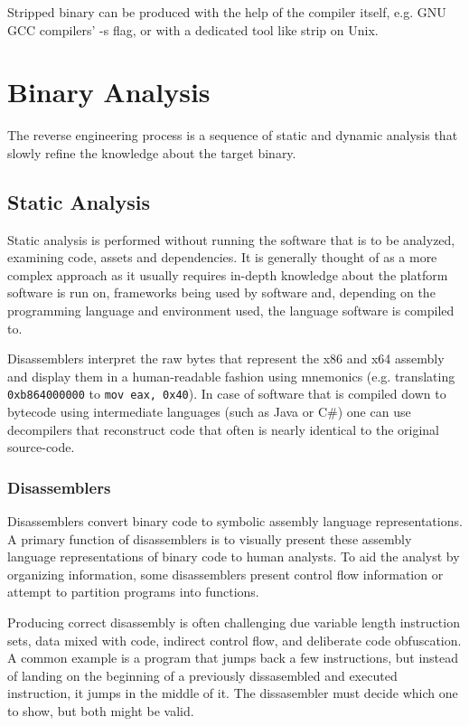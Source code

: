 \documentclass{article}
\begin{document}
Stripped binary can be produced with the help of the compiler itself, e.g. GNU GCC compilers' -s flag, or with 
a dedicated tool like strip on Unix.

\pagebreak
\section{Binary Analysis}

The reverse engineering process is a sequence of static and dynamic analysis that slowly refine the knowledge 
about the target binary.

\subsection{Static Analysis}

Static analysis is performed without running the software that is to be analyzed, examining code, assets and 
dependencies. It is generally thought of as a more complex approach as it usually requires in-depth knowledge 
about the platform software is run on, frameworks being used by software and, depending on the programming language 
and environment used, the language software is compiled to. 

Disassemblers interpret the raw bytes that represent the x86 and x64 assembly and display them in a human-readable 
fashion using mnemonics (e.g. translating \texttt{0xb864000000} to \texttt{mov eax, 0x40}). In case of software 
that is compiled down to bytecode using intermediate languages (such as Java or C\#) one can use decompilers
that reconstruct code that often is nearly identical to the original source-code.

\subsubsection{Disassemblers}

Disassemblers convert binary code to symbolic assembly language representations. A primary function of disassemblers 
is to visually present these assembly language representations of binary code to human analysts. To aid the analyst 
by organizing information, some disassemblers present control ﬂow information or attempt to partition programs into 
functions. \citep{disass}

Producing correct disassembly is often challenging due variable length instruction sets, data mixed with code,
indirect control ﬂow, and deliberate code obfuscation. A common example is
a program that jumps back a few instructions, but instead of landing on the beginning 
of a previously dissasembled and executed instruction, it jumps in the middle of it. 
The dissasembler must decide which one to show, but both might be valid.
\end{document}
